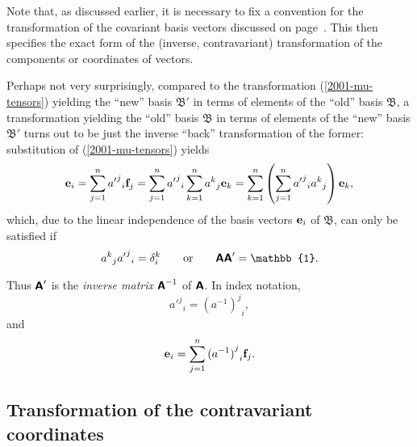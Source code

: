 Note that, as discussed earlier, it is necessary to fix a convention for the transformation of the covariant basis vectors discussed on page~\pageref{2016-m-ch-fdvs-oic}.
This then specifies the exact form of the (inverse, contravariant) transformation of the components or coordinates of vectors.



Perhaps not very surprisingly, compared to the transformation (\ref{2001-mu-tensors}) yielding the ``new'' basis
${\mathfrak B'}$  in terms of elements of the ``old'' basis ${\mathfrak B}$,
a transformation  yielding the ``old'' basis
${\mathfrak B}$  in terms of elements of the ``new'' basis ${\mathfrak B'}$ turns out to be just the inverse ``back'' transformation of the former:
substitution of (\ref{2001-mu-tensors}) yields
\begin{equation}
{\bf e}_i=\sum_{j=1}^n {{a'}^j}_i {\bf f}_j
=\sum_{j=1}^n {{a'}^j}_i  \sum_{k=1}^n {a^k}_j {\bf e}_k
=\sum_{k=1}^n \left(\sum_{j=1}^n  {{a'}^j}_i  {a^k}_j \right) {\bf e}_k,
\end{equation}
which, due to the linear independence of the basis vectors ${\bf e}_i$ of ${\mathfrak B}$,
can only be satisfied if
\begin{equation}
{a^k}_j  {{a'}^j}_i =\delta_i^k
\qquad
{\rm or}
\qquad
\textsf{\textbf{A}}\textsf{\textbf{A}}'=\mathbb{1}.
\end{equation}

Thus $\textsf{\textbf{A}}'$ is the {\em inverse matrix}
$\textsf{\textbf{A}}^{-1}$  of $\textsf{\textbf{A}}$. In index notation,
\begin{equation}
{{a'}^j}_i ={{(a^{-1})}^j}_i
,
\label{2001-mu-tensor-tl2}
\end{equation}
and
\begin{equation}
{\bf e}_i=\sum_{j=1}^n {{(a^{-1})}^j}_i  {\bf f}_j
.
\label{2012-m-ch-tlcbv}
\end{equation}

\subsection{Transformation of the contravariant coordinates}


